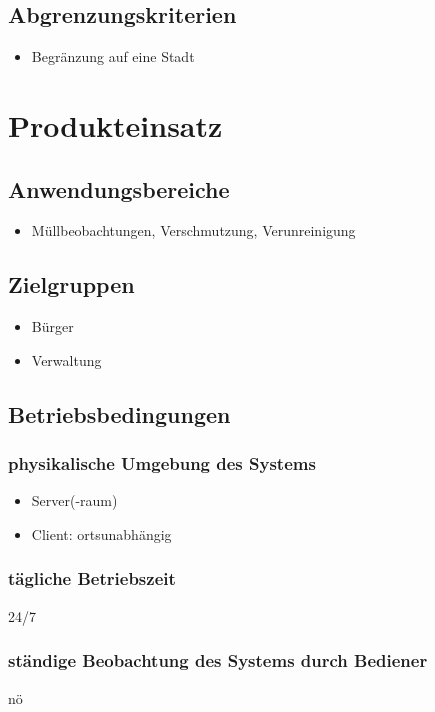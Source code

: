 \documentclass[a4paper,11pt]{article}             %
\begin{document}
\subsection{Abgrenzungskriterien}
\begin{itemize}
\item Begränzung auf eine Stadt
\end{itemize}
\section{Produkteinsatz}
\subsection{Anwendungsbereiche}
\begin{itemize}
\item Müllbeobachtungen, Verschmutzung, Verunreinigung
\end{itemize}
\subsection{Zielgruppen}
\begin{itemize}
\item Bürger
\item Verwaltung
\end{itemize}
\subsection{Betriebsbedingungen}
\subsubsection{physikalische Umgebung des Systems}
\begin{itemize}
\item Server(-raum)
\item Client: ortsunabhängig
\end{itemize}
\subsubsection{tägliche Betriebszeit}
24/7
\subsubsection{ständige Beobachtung des Systems durch Bediener}
nö
\end{document}
